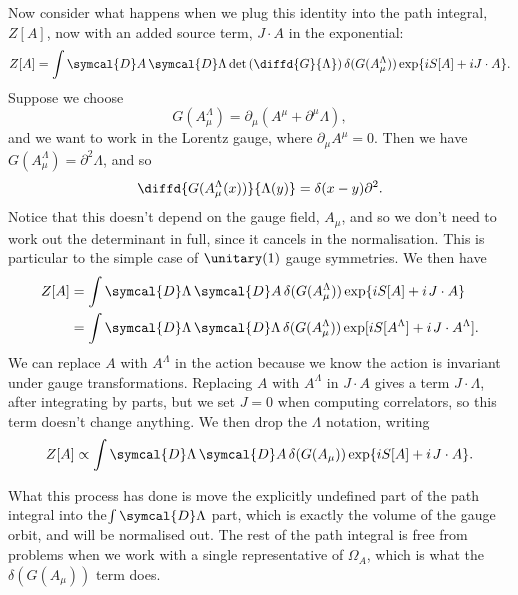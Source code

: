 \documentclass[fleqn]{NotesClass}
\newcommand{\dalembertian}{\partial^2}
\newcommand{\DL}[1]{\symcal{D}#1}
\newcommand{\DD}[1]{\,\symcal{D}#1}
\begin{document}
    Now consider what happens when we plug this identity into the path integral, \(Z[A]\), now with an added source term, \(J \cdot A\) in the exponential:
    \begin{equation}
        Z[A] = \int \DL{A} \DD{\Lambda} \det\left( \diffd{G}{\Lambda} \right) \delta(G(A^\Lambda_\mu)) \exp\{iS[A] + iJ \cdot A\}.
    \end{equation}
    Suppose we choose
    \begin{equation}
        G(A^\Lambda_{\mu}) = \partial_\mu(A^\mu + \partial^\mu \Lambda),
    \end{equation}
    and we want to work in the Lorentz gauge, where \(\partial_\mu A^\mu = 0\).
    Then we have \(G(A_\mu^{\Lambda}) = \dalembertian \Lambda\), and so
    \begin{equation}
        \diffd{G(A_\mu^\Lambda(x))}{\Lambda(y)} = \delta(x - y) \dalembertian.
    \end{equation}
    Notice that this doesn't depend on the gauge field, \(A_\mu\), and so we don't need to work out the determinant in full, since it cancels in the normalisation.
    This is particular to the simple case of \(\unitary(1)\) gauge symmetries.
    We then have
    \begin{align}
        Z[A] &= \int \DL{\Lambda} \DD{A} \, \delta(G(A_\mu^\Lambda)) \exp\{iS[A] + i \mkern2mu J\cdot A\}\\
        &= \int \DL{\Lambda} \DD{\Lambda} \, \delta(G(A_\mu^\Lambda)) \exp[iS[A^\Lambda] + i \mkern2mu J \cdot A^\Lambda].
    \end{align}
    We can replace \(A\) with \(A^\Lambda\) in the action because we know the action is invariant under gauge transformations.
    Replacing \(A\) with \(A^\Lambda\) in \(J \cdot A\) gives a term \(J \cdot \Lambda\), after integrating by parts, but we set \(J = 0\) when computing correlators, so this term doesn't change anything.
    We then drop the \(\Lambda\) notation, writing
    \begin{equation}
        Z[A] \propto \int \DL{\Lambda} \DD{A} \, \delta(G(A_\mu)) \exp\{iS[A] + i \mkern2mu J \cdot A\}.
    \end{equation}

    What this process has done is move the explicitly undefined part of the path integral into the\(\int \DL{\Lambda}\) part, which is exactly the volume of the gauge orbit, and will be normalised out.
    The rest of the path integral is free from problems when we work with a single representative of \(\Omega_A\), which is what the \(\delta(G(A_\mu))\) term does.
    
\end{document}

